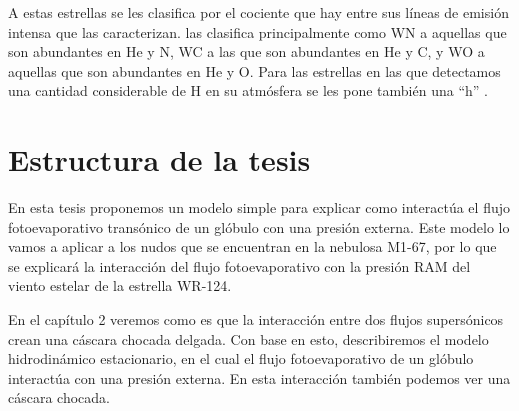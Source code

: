 \documentclass{book}
\begin{document}
A estas estrellas se les clasifica por el cociente que hay entre sus líneas de emisión intensa que las caracterizan. \cite{Smith:1968} las clasifica principalmente como WN a aquellas que son abundantes en He y N, WC a las que son abundantes en He y C, y WO a aquellas que son abundantes en He y O. Para las estrellas en las que detectamos una cantidad considerable de H en su atmósfera se les pone también una ``h'' \citep{SSM:1996}.



\section{Estructura de la tesis}

En esta tesis proponemos un modelo simple para explicar como interactúa el flujo fotoevaporativo transónico de un glóbulo con una presión externa. Este modelo lo vamos a aplicar  a los nudos que se encuentran en la nebulosa M1-67, por lo que se explicará la interacción del flujo fotoevaporativo con la presión RAM del viento estelar de la estrella WR-124.

En el capítulo 2 veremos como es que la interacción entre dos flujos supersónicos crean una cáscara chocada delgada. Con base en esto, describiremos el modelo hidrodinámico estacionario, en el cual el flujo fotoevaporativo de un glóbulo interactúa con una presión externa. En esta interacción también podemos ver una cáscara chocada.
\end{document}
